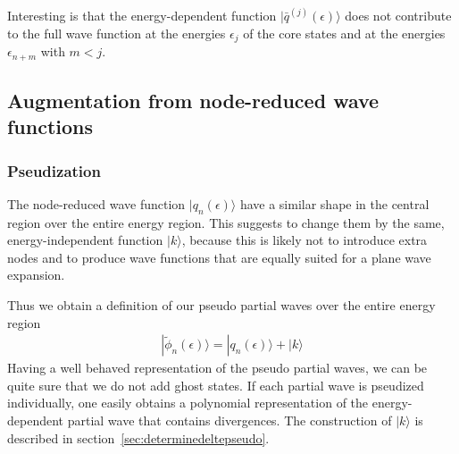 \documentclass[11pt,a4paper]{report}
\begin{document}
Interesting is that the energy-dependent function
$|\bar{q}^{(j)}(\epsilon)\rangle$ does not contribute to the full wave
function at the energies $\epsilon_{j}$ of the core states and at the
energies $\epsilon_{n+m}$ with $m<j$.



\subsection{Augmentation from node-reduced wave functions}
\subsubsection{Pseudization}

The node-reduced wave function $|q_n(\epsilon)\rangle$ have a similar
shape in the central region over the entire energy region. This
suggests to change them by the same, energy-independent function
$|k\rangle$, because this is likely not to introduce extra nodes and
to produce wave functions that are equally suited for a plane wave
expansion.

Thus we obtain a definition of our pseudo partial waves over the
entire energy region
\begin{eqnarray}
|\tilde{\phi}_n(\epsilon)\rangle
=|q_n(\epsilon)\rangle+|k\rangle
\label{eq:defphitildenofe}
\end{eqnarray}
Having a well behaved representation of the pseudo partial waves, we
can be quite sure that we do not add ghost states. If each partial
wave is pseudized individually, one easily obtains a polynomial
representation of the energy-dependent partial wave that contains
divergences.  The construction of $|k\rangle$ is described in
section~\ref{sec:determinedeltepseudo}.

\end{document}

